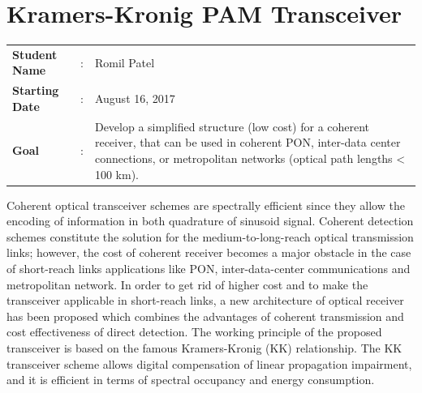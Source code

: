 \clearpage
\section{Kramers-Kronig PAM Transceiver}

\begin{tcolorbox}	
\begin{tabular}{p{2.75cm} p{0.2cm} p{10.5cm}} 	
\textbf{Student Name}  &:& Romil Patel\\
\textbf{Starting Date} &:& August 16, 2017\\
\textbf{Goal}          &:& Develop a simplified structure (low cost) for a coherent receiver, that can be used in coherent PON, inter-data center connections, or metropolitan networks (optical path lengths < 100 km).
\end{tabular}
\end{tcolorbox}

Coherent optical transceiver schemes are spectrally efficient since they allow the encoding of information in both quadrature of sinusoid signal. Coherent detection schemes constitute the solution for the medium-to-long-reach optical transmission links; however, the cost of coherent receiver becomes a major obstacle in the case of short-reach links applications like PON, inter-data-center communications and metropolitan network. In order to get rid of higher cost and to make the transceiver applicable in short-reach links, a new architecture of optical receiver has been proposed which combines the advantages of coherent transmission and cost effectiveness of direct detection. The working principle of the proposed transceiver is based on the famous Kramers-Kronig (KK) relationship. The KK transceiver scheme allows digital compensation of linear propagation impairment, and it is efficient in terms of spectral occupancy and energy consumption. 
